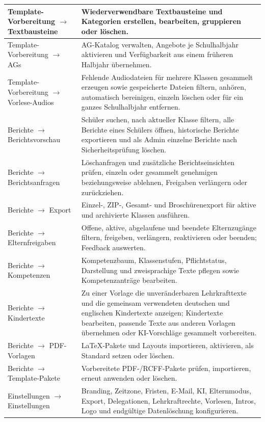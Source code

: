 \documentclass[12pt,a4paper]{article}
\begin{document}
\begin{longtable}{|p{}|p{}|}
\hline
Template-Vorbereitung \(\rightarrow\) Textbausteine & Wiederverwendbare Textbausteine und Kategorien erstellen, bearbeiten, gruppieren oder löschen.\\
\hline
Template-Vorbereitung \(\rightarrow\) AGs & AG-Katalog verwalten, Angebote je Schulhalbjahr aktivieren und Verfügbarkeit aus einem früheren Halbjahr übernehmen.\\
\hline
Template-Vorbereitung \(\rightarrow\) Vorlese-Audios & Fehlende Audiodateien für mehrere Klassen gesammelt erzeugen sowie gespeicherte Dateien filtern, anhören, automatisch bereinigen, einzeln löschen oder für ein ganzes Schulhalbjahr entfernen.\\
\hline
Berichte \(\rightarrow\) Berichtsvorschau & Schüler suchen, nach aktueller Klasse filtern, alle Berichte eines Schülers öffnen, historische Berichte exportieren und als Admin einzelne Berichte nach Sicherheitsprüfung löschen.\\
\hline
Berichte \(\rightarrow\) Berichtsanfragen & Löschanfragen und zusätzliche Berichtseinsichten prüfen, einzeln oder gesammelt genehmigen beziehungsweise ablehnen, Freigaben verlängern oder zurückziehen.\\
\hline
Berichte \(\rightarrow\) Export & Einzel-, ZIP-, Gesamt- und Broschürenexport für aktive und archivierte Klassen ausführen.\\
\hline
Berichte \(\rightarrow\) Elternfreigaben & Offene, aktive, abgelaufene und beendete Elternzugänge filtern, freigeben, verlängern, reaktivieren oder beenden; Feedback auswerten.\\
\hline
Berichte \(\rightarrow\) Kompetenzen & Kompetenzbaum, Klassenstufen, Pflichtstatus, Darstellung und zweisprachige Texte pflegen sowie Kompetenzanträge bearbeiten.\\
\hline
Berichte \(\rightarrow\) Kindertexte & Zu einer Vorlage die unveränderbaren Lehrkrafttexte und die gemeinsam verwendeten deutschen und englischen Kindertexte anzeigen; Kindertexte bearbeiten, passende Texte aus anderen Vorlagen übernehmen oder KI-Vorschläge gesammelt vorbereiten.\\
\hline
Berichte \(\rightarrow\) PDF-Vorlagen & LaTeX-Pakete und Layouts importieren, aktivieren, als Standard setzen oder löschen.\\
\hline
Berichte \(\rightarrow\) Template-Pakete & Vorbereitete PDF-/RCFF-Pakete prüfen, importieren, erneut anwenden oder löschen.\\
\hline
Einstellungen \(\rightarrow\) Einstellungen & Branding, Zeitzone, Fristen, E-Mail, KI, Elternmodus, Export, Delegationen, Lehrkraftrechte, Vorlesen, Intros, Logo und endgültige Datenlöschung konfigurieren.\\

\end{longtable}
\end{document}
